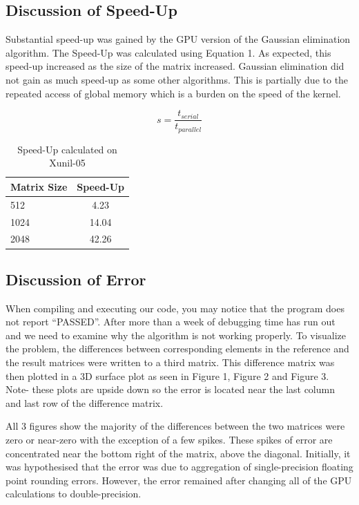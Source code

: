\documentclass[12pt]{article}
\begin{document}
\subsection{Discussion of Speed-Up}

Substantial speed-up was gained by the GPU version of the
Gaussian elimination algorithm. The Speed-Up was calculated 
using Equation 1. As expected, this speed-up increased as
the size of the matrix increased. Gaussian elimination
did not gain as much speed-up as some other algorithms.
This is partially due to the repeated access of global 
memory which is a burden on the speed of the kernel.

\begin{equation}
    s = \frac{t_{serial}}{t_{parallel}}\label{eq1}
\end{equation}

\begin{table}[H]
\centering
\begin{tabular}{@{}|l|c|}
\hline
Matrix Size & Speed-Up \\ \hline
512  &  4.23   \\ \hline
1024 &  14.04  \\ \hline
2048 &  42.26  \\ \hline
\end{tabular}
\caption{Speed-Up calculated on Xunil-05}
\end{table}

\subsection{Discussion of Error}

When compiling and executing our code, you may notice that
the program does not report ``PASSED''. After more than a
week of debugging time has run out and we need to examine
why the algorithm is not working properly. To visualize
the problem, the differences between corresponding elements
in the reference and the result matrices were written to
a third matrix. This difference matrix was then plotted
in a 3D surface plot as seen in Figure 1, Figure 2 and Figure 3.
Note- these plots are upside down so the error is located near
the last column and last row of the difference matrix.

All 3 figures show the majority of the differences between
the two matrices were zero or near-zero with the exception
of a few spikes. These spikes of error are concentrated 
near the bottom right of the matrix, above the diagonal.
Initially, it was hypothesised that the error was due to aggregation
of single-precision floating point rounding errors. However,
the error remained after changing all of the GPU calculations to
double-precision.
\end{document}
